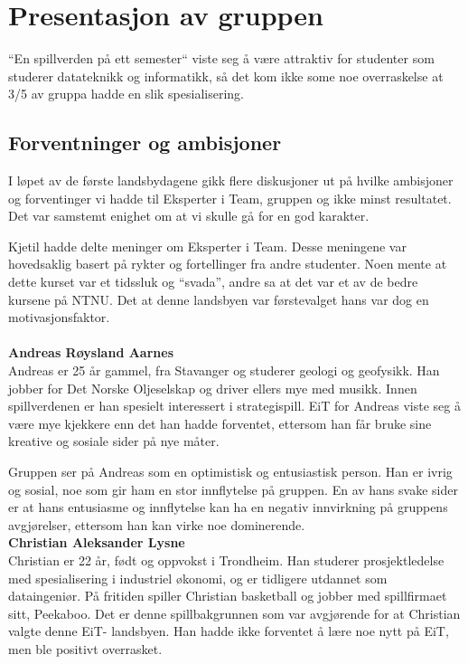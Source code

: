 \section{Presentasjon av gruppen}
``En spillverden på ett semester`` viste seg å være attraktiv for
studenter som studerer datateknikk og informatikk, så det kom ikke some
noe overraskelse at 3/5 av gruppa hadde en slik spesialisering.

\subsection{Forventninger og ambisjoner}
I løpet av de første landsbydagene gikk flere diskusjoner ut på hvilke
ambisjoner og forventinger vi hadde til Eksperter i Team, gruppen og
ikke minst resultatet. Det var samstemt enighet om at vi skulle gå for
en god karakter.

Kjetil hadde delte meninger om Eksperter i Team. Desse meningene var
hovedsaklig basert på rykter og fortellinger fra andre studenter. Noen
mente at dette kurset var et tidssluk og ``svada'', andre sa at det var
et av de bedre kursene på NTNU. Det at denne landsbyen var førstevalget
hans var dog en motivasjonsfaktor.
\\
\\
\textbf{Andreas Røysland Aarnes}\\
Andreas er 25 år gammel, fra Stavanger og studerer geologi og geofysikk. Han jobber for Det Norske Oljeselskap og driver ellers mye med musikk. Innen spillverdenen er han spesielt interessert i strategispill. EiT for Andreas viste seg å være mye kjekkere enn det han hadde forventet, ettersom han får bruke sine kreative og sosiale sider på nye måter. 

Gruppen ser på Andreas som en optimistisk og entusiastisk person. Han er ivrig og sosial, noe som gir ham en stor innflytelse på gruppen. En av hans svake sider er at hans entusiasme og innflytelse kan ha en negativ innvirkning på gruppens avgjørelser, ettersom han kan virke noe dominerende. \\


\textbf{Christian Aleksander Lysne}\\
Christian er 22 år, født og oppvokst i Trondheim. Han studerer prosjektledelse med spesialisering i industriel økonomi, og er tidligere utdannet som dataingeniør. På fritiden spiller Christian basketball og jobber med spillfirmaet sitt, Peekaboo. Det er denne spillbakgrunnen som var avgjørende for at Christian valgte denne EiT- landsbyen. Han hadde ikke forventet å lære noe nytt på EiT, men ble positivt overrasket.   

